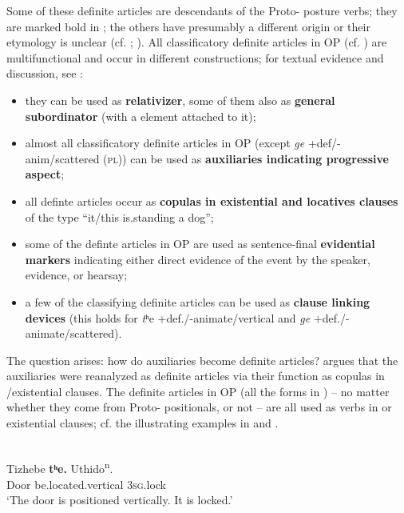 \documentclass[output=paper]{langsci/langscibook}
\begin{document}
Some of these definite articles are descendants of the Proto- posture verbs; they are marked bold in ; the others have presumably a different origin or their etymology is unclear (cf. \citealt[209]{Rankin2004a}; \citealt[181ff]{Eschenberg2005}).
All classificatory definite articles in OP (cf. ) are multifunctional and occur in different constructions; for textual evidence and discussion, see \citet[112--176]{Eschenberg2005}:

\begin{itemize}
\item
they can be used as \textbf{relativizer}, some of them also as \textbf{general subordinator} (with a  element attached to it);
\item
almost all classificatory definite articles in OP (except \textit{ge} +def/-anim\slash scat\-tered (\textsc{pl})) can be used as \textbf{auxiliaries indicating progressive aspect};
\item
all definte articles occur as \textbf{copulas in existential and locatives clauses} of the type ``it/this is.standing a dog'';
\item
some of the definte articles in OP are used as sentence-final \textbf{evidential markers} indicating either direct evidence of the event by the speaker,  evidence, or hearsay;
\item
a few of the classifying definite articles can be used as \textbf{clause linking devices} (this holds for \textit{t}{ʰ}{e} +def./-animate\slash vertical and \textit{ge} +def./-animate\slash scattered).
\end{itemize}

The question arises: how do  auxiliaries become definite articles? \citet[182--206]{Eschenberg2005} argues that the  auxiliaries were reanalyzed as definite articles via their function as copulas in \slash existential clauses. The definite articles in OP (all the forms in ) -- no matter whether they come from Proto- positionals, or not – are all used as  verbs in  or existential clauses; cf. the illustrating examples in  and .

 \ea \label{ex:helmbrecht:21}
 \\
\gll Tizhebe \textbf{tʰe.}                            Uthido\textsuperscript{n}.\\
    Door     be.located.vertical    \textsc{3sg}.lock\\
\glt    ‘The door is positioned vertically. It is locked.’ \citep[189]{Eschenberg2005}
\z
\end{document}
